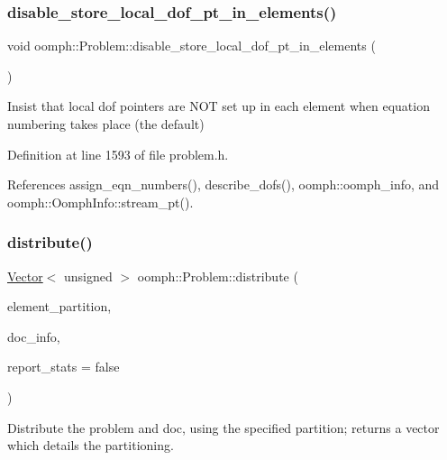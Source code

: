\subsubsection{\texorpdfstring{disable\+\_\+store\+\_\+local\+\_\+dof\+\_\+pt\+\_\+in\+\_\+elements()}{disable\_store\_local\_dof\_pt\_in\_elements()}}
{\footnotesize\ttfamily void oomph\+::\+Problem\+::disable\+\_\+store\+\_\+local\+\_\+dof\+\_\+pt\+\_\+in\+\_\+elements (\begin{DoxyParamCaption}{ }\end{DoxyParamCaption})\hspace{0.3cm}{\ttfamily [inline]}}



Insist that local dof pointers are N\+OT set up in each element when equation numbering takes place (the default) 



Definition at line 1593 of file problem.\+h.



References assign\+\_\+eqn\+\_\+numbers(), describe\+\_\+dofs(), oomph\+::oomph\+\_\+info, and oomph\+::\+Oomph\+Info\+::stream\+\_\+pt().

\mbox{\label{classoomph_1_1Problem_aa35e1adc0fdf14b217c7b608eb9cf20b}} 
\subsubsection{\texorpdfstring{distribute()}{distribute()}\hspace{0.1cm}{\footnotesize\ttfamily [1/4]}}
{\footnotesize\ttfamily \hyperlink{classoomph_1_1Vector}{Vector}$<$ unsigned $>$ oomph\+::\+Problem\+::distribute (\begin{DoxyParamCaption}\item[{const \hyperlink{classoomph_1_1Vector}{Vector}$<$ unsigned $>$ \&}]{element\+\_\+partition,  }\item[{\hyperlink{classoomph_1_1DocInfo}{Doc\+Info} \&}]{doc\+\_\+info,  }\item[{const bool \&}]{report\+\_\+stats = {\ttfamily false} }\end{DoxyParamCaption})}



Distribute the problem and doc, using the specified partition; returns a vector which details the partitioning. 


